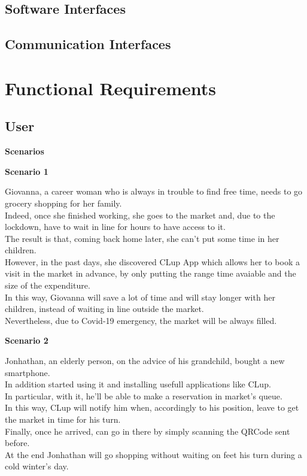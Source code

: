 \subsection{Software Interfaces}
\subsection{Communication Interfaces}
\section{Functional Requirements}
\subsection{User}
\par \medskip
{\large \textbf{Scenarios}}
\par \medskip
{\normalsize \textbf{Scenario 1}}
\par \medskip
Giovanna, a career woman who is always in trouble to find free time, needs to go grocery shopping for her family. \\ 
Indeed, once she finished working, she goes to the market and, due to the lockdown, have to wait in line for hours to have access to it. \\
The result is that, coming back home later, she can't put some time in her children.\\
However, in the past days, she discovered CLup App which allows her to book a visit in the market in advance, by only putting the range time avaiable and the size of the expenditure.\\
In this way, Giovanna will save a lot of time and will stay longer with her children, instead of waiting in line outside the market.\\
Nevertheless, due to Covid-19 emergency, the market will be always filled.
\par \medskip 
{\normalsize \textbf{Scenario 2}}
\par \medskip
Jonhathan, an elderly person, on the advice of his grandchild, bought a new smartphone.\\
In addition started using it and installing usefull applications like CLup.\\
In particular, with it, he'll be able to make a reservation in market's queue.\\
In this way, CLup will notify him when, accordingly to his position, leave to get the market in time for his turn.\\
Finally, once he arrived, can go in there by simply scanning the QRCode sent before. \\
At the end Jonhathan will go shopping without waiting on feet his turn during a cold winter's day.\\
\par \medskip 

